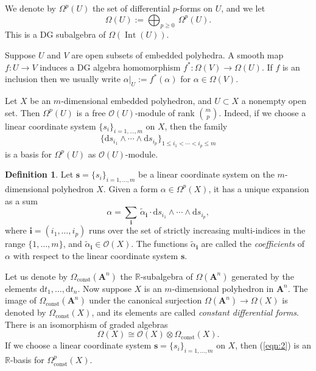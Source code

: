 \documentclass[10pt, a4paper]{amsart}
\theoremstyle{definition}
\newtheorem{dfn}[equation]{Definition}
\numberwithin{equation}{section}
\newcommand{\opn}{\operatorname}
\newcommand{\mcal}[1]{\mathcal{#1}}
\newcommand{\mbf}[1]{\mathbf{#1}}
\newcommand{\mrm}[1]{\mathrm{#1}}
\newcommand{\mbb}[1]{\mathbb{#1}}
\newcommand{\bsym}[1]{\boldsymbol{#1}}
\newcommand{\til}[1]{\tilde{#1}}
\newcommand{\R}{\mbb{R}}
\renewcommand{\d}{\mrm{d}}
\begin{document}
We denote by $\Omega^p(U)$ the set of differential $p$-forms on
$U$, and we let 
\[ \Omega(U) := \bigoplus_{p \geq 0} \ \Omega^p(U) . \]
This is a DG subalgebra of $\Omega(\opn{Int}(U))$. 

Suppose $U$ and $V$ are open subsets of  embedded polyhedra. 
A smooth map $f : U \to V$  induces a DG algebra homomorphism 
$f^* : \Omega(V) \to \Omega(U)$.
If $f$ is an inclusion then we
usually write $\alpha|_U := f^*(\alpha)$ for $\alpha \in \Omega(V)$. 

Let $X$ be an $m$-dimensional embedded polyhedron, and $U \subset X$ a nonempty
open set. Then $\Omega^p(U)$ is a free $\mcal{O}(U)$-module of rank
$\binom{m}{p}$. Indeed, if we choose a linear coordinate system 
$\{ s_i \}_{i = 1, \ldots, m}$ on $X$, then the family
\begin{equation} \label{eqn:2}
\{ \d s_{i_1} \wedge \cdots \wedge \d s_{i_p} \}_{1 \leq i_1 < \cdots < i_p
\leq m}
\end{equation}
is a basis for $\Omega^p(U)$ as $\mcal{O}(U)$-module.

\begin{dfn} \label{dfn:27}
Let $\bsym{s} =  \{ s_i \}_{i = 1, \ldots, m}$ be a linear coordinate system
on the $m$-dimensional polyhedron $X$. Given a form 
$\alpha \in \Omega^p(X)$, it has a unique expansion as a sum
\[ \alpha = \sum_{\bsym{i}} \, 
\til{\alpha}_{\bsym{i}} \cdot \d s_{i_1} \wedge \cdots \wedge \d s_{i_p} , \]
where 
$\bsym{i} = (i_1, \ldots, i_p)$ runs over the set of strictly increasing
multi-indices in the range $\{ 1, \ldots, m \}$,  and 
$\til{\alpha}_{\bsym{i}} \in \mcal{O}(X)$.
The functions $\til{\alpha}_{\bsym{i}}$ are called the {\em coefficients}
of $\alpha$ with respect to the linear coordinate system 
$\bsym{s}$.
\end{dfn}

Let us denote by $\Omega_{\mrm{const}}(\mbf{A}^{n})$ the $\R$-subalgebra of
$\Omega(\mbf{A}^{n})$
generated by the elements $\d t_1, \ldots, \d t_n$. 
Now suppose $X$ is an $m$-dimensional polyhedron in $\mbf{A}^{n}$.
The image of
$\Omega_{\mrm{const}}(\mbf{A}^{n})$ under the canonical surjection
$\Omega(\mbf{A}^{n})\to \Omega(X)$
is denoted by $\Omega_{\mrm{const}}(X)$, and its elements are called
{\em constant differential forms}. There is an isomorphism of graded algebras
\[ \Omega(X) \cong \mcal{O}(X) \otimes \Omega_{\mrm{const}}(X) . \]
If we choose a linear coordinate system 
$\bsym{s} = \{ s_i \}_{i = 1, \ldots, m}$ on $X$, then (\ref{eqn:2}) is an
$\R$-basis for $\Omega^p_{\mrm{const}}(X)$.
\end{document}
